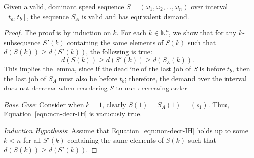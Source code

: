 \begin{lemma}\label{lemma:non-decreasing}
Given a valid, dominant speed sequence $S = (\omega_1, \omega_2, \ldots, \omega_n)$ over interval $[t_a, t_b]$, the sequence $S_A$ is valid and has equivalent demand.
\end{lemma}
\begin{proof}
The proof is by induction on $k$.  For each $k \in \mathbb{N}_1^n$, we show that for any $k$-subsequence $S'(k)$ containing the same elements of $S(k)$ such that $d(S(k)) \geq d(S'(k))$, the following is true:
\begin{equation}\label{eqn:non-decr-IH}
    d(S(k)) \geq d(S'(k)) \geq d(S_A(k)).
\end{equation}
\noindent This implies the lemma, since if the deadline of the last job of $S$ is before $t_b$, then the last job of $S_A$ must also be before $t_b$; therefore, the demand over the interval does not decrease when reordering $S$ to non-decreasing order.
 
\noindent \emph{Base Case}: Consider when $k=1$, clearly $S(1)=S_A(1) = (s_1)$.  Thus, Equation~\ref{eqn:non-decr-IH} is vacuously true.

\noindent \emph{Induction Hypothesis}:  Assume that Equation~\ref{eqn:non-decr-IH} holds up to some $k < n$ for all $S'(k)$ containing the same elements of $S(k)$ such that $d(S(k)) \geq d(S'(k))$.


\end{proof}
